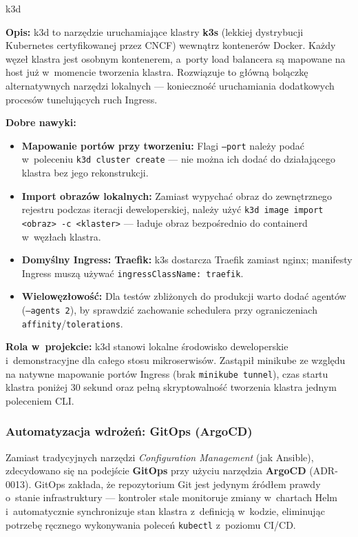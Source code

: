 \begin{techcard}{k3d}

\textbf{Opis:} k3d to narzędzie uruchamiające klastry \textbf{k3s} (lekkiej dystrybucji Kubernetes certyfikowanej przez CNCF) wewnątrz kontenerów Docker. Każdy węzeł klastra jest osobnym kontenerem, a~porty load balancera są mapowane na host już w~momencie tworzenia klastra. Rozwiązuje to główną bolączkę alternatywnych narzędzi lokalnych --- konieczność uruchamiania dodatkowych procesów tunelujących ruch Ingress.

\textbf{Dobre nawyki:}
\begin{itemize}
  \item \textbf{Mapowanie portów przy tworzeniu:} Flagi \texttt{--port} należy podać w~poleceniu \texttt{k3d cluster create} --- nie można ich dodać do działającego klastra bez jego rekonstrukcji.
  \item \textbf{Import obrazów lokalnych:} Zamiast wypychać obraz do zewnętrznego rejestru podczas iteracji deweloperskiej, należy użyć \texttt{k3d image import <obraz> -c <klaster>} --- ładuje obraz bezpośrednio do containerd w~węzłach klastra.
  \item \textbf{Domyślny Ingress: Traefik:} k3s dostarcza Traefik zamiast nginx; manifesty Ingress muszą używać \texttt{ingressClassName: traefik}.
  \item \textbf{Wielowęzłowość:} Dla testów zbliżonych do produkcji warto dodać agentów (\texttt{--agents 2}), by sprawdzić zachowanie schedulera przy ograniczeniach \texttt{affinity}/\texttt{tolerations}.
\end{itemize}

\textbf{Rola w~projekcie:} k3d stanowi lokalne środowisko deweloperskie i~demonstracyjne dla całego stosu mikroserwisów. Zastąpił minikube ze względu na natywne mapowanie portów Ingress (brak \texttt{minikube tunnel}), czas startu klastra poniżej 30 sekund oraz pełną skryptowalność tworzenia klastra jednym poleceniem CLI.

\end{techcard}

\subsubsection{Automatyzacja wdrożeń: GitOps (ArgoCD)}
Zamiast tradycyjnych narzędzi \textit{Configuration Management} (jak Ansible), zdecydowano się na podejście \textbf{GitOps} przy użyciu narzędzia \textbf{ArgoCD} (ADR-0013). GitOps zakłada, że repozytorium Git jest jedynym źródłem prawdy o~stanie infrastruktury --- kontroler stale monitoruje zmiany w~chartach Helm i~automatycznie synchronizuje stan klastra z~definicją w~kodzie, eliminując potrzebę ręcznego wykonywania poleceń \texttt{kubectl} z~poziomu CI/CD.

